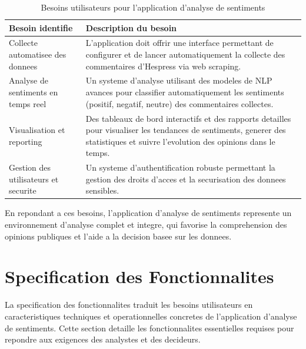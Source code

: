 \begin{table}[H]
\centering
\begin{tabularx}{\textwidth}{|l|X|}
\hline
\textbf{Besoin identifie} & \textbf{Description du besoin} \\
\hline
Collecte automatisee des donnees & 
L'application doit offrir une interface permettant de configurer et de lancer automatiquement la collecte des commentaires d'Hespress via web scraping. \\
\hline
Analyse de sentiments en temps reel & 
Un systeme d'analyse utilisant des modeles de NLP avances pour classifier automatiquement les sentiments (positif, negatif, neutre) des commentaires collectes. \\
\hline
Visualisation et reporting & 
Des tableaux de bord interactifs et des rapports detailles pour visualiser les tendances de sentiments, generer des statistiques et suivre l'evolution des opinions dans le temps. \\
\hline
Gestion des utilisateurs et securite & 
Un systeme d'authentification robuste permettant la gestion des droits d'acces et la securisation des donnees sensibles. \\
\hline
\end{tabularx}
\caption{Besoins utilisateurs pour l'application d'analyse de sentiments}
\label{tab:besoins-utilisateurs}
\end{table}

En repondant a ces besoins, l'application d'analyse de sentiments represente un environnement d'analyse complet et integre, qui favorise la comprehension des opinions publiques et l'aide a la decision basee sur les donnees.

\section{Specification des Fonctionnalites}

La specification des fonctionnalites traduit les besoins utilisateurs en caracteristiques techniques et operationnelles concretes de l'application d'analyse de sentiments. Cette section detaille les fonctionnalites essentielles requises pour repondre aux exigences des analystes et des decideurs.


